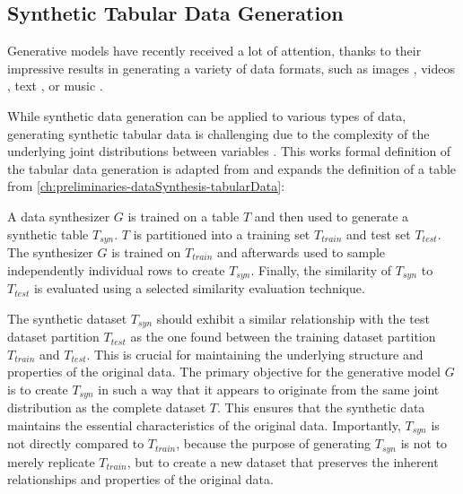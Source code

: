 \subsection{Synthetic Tabular Data Generation}
\label{sec: synthetic tabular data generation}

Generative models have recently received a lot of attention, thanks to their impressive results in generating a variety of data formats, 
such as images \cite{ho2020DenoisingDiffusionProbabilistic, dhariwal2021DiffusionModelsBeat, rombach2022HighResolutionImageSynthesis}, videos \cite{ho2022VideoDiffusionModels, runwayGen1Runway}, text \cite{radfordImprovingLanguageUnderstanding, openai2022ChatGPTOptimizingLanguage}, or music \cite{agostinelli2023MusicLMGeneratingMusic, Forsgren_Martiros_2022}.

While synthetic data generation can be applied to various types of data, generating synthetic tabular data is challenging due to the complexity of the underlying joint distributions between variables \cite{borisov2022DeepNeuralNetworks}.
This works formal definition of the tabular data generation is adapted from \cite[p. 2]{xu2019ModelingTabularData} and expands the definition of a table from \autoref{ch:preliminaries-dataSynthesis-tabularData}:

\begin{displayquote}
    A data synthesizer $G$ is trained on a table $T$ and then used to generate a synthetic table $T_{syn}$. %
    $T$ is partitioned into a training set $T_{train}$ and test set $T_{test}$. 
    The synthesizer $G$ is trained on $T_{train}$ and afterwards used to sample independently individual rows to create $T_{syn}$.
    Finally, the similarity of $T_{syn}$ to $T_{test}$ is evaluated using a selected similarity evaluation technique.
\end{displayquote}

The synthetic dataset $T_{syn}$ should exhibit a similar relationship with the test dataset partition $T_{test}$ 
as the one found between the training dataset partition $T_{train}$ and $T_{test}$. 
This is crucial for maintaining the underlying structure and properties of the original data.
The primary objective for the generative model $G$ is to create $T_{syn}$ in such a way that it appears to originate from the same joint distribution as the complete dataset $T$. 
This ensures that the synthetic data maintains the essential characteristics of the original data.
Importantly, $T_{syn}$ is not directly compared to $T_{train}$, because the purpose of generating $T_{syn}$ is not to merely replicate $T_{train}$,
but to create a new dataset that preserves the inherent relationships and properties of the original data.

